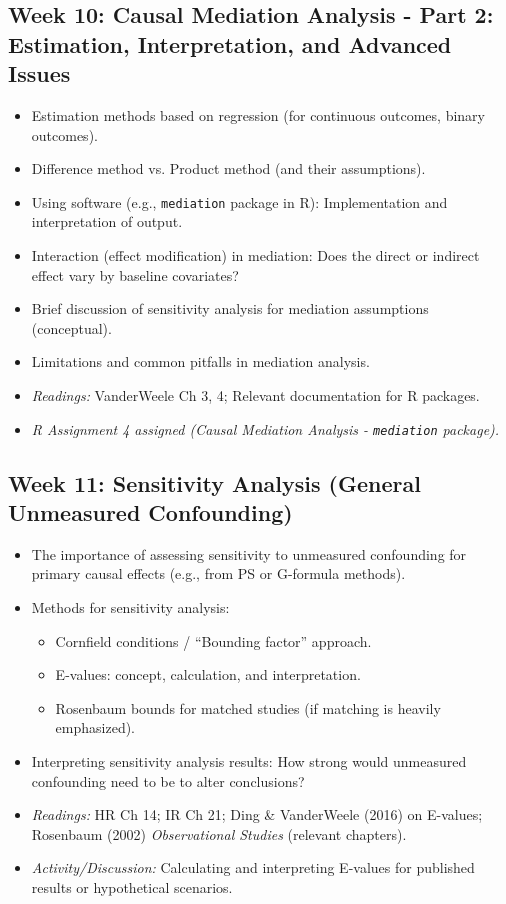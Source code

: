 \documentclass[10.5pt]{article}
\begin{document}
\subsection*{Week 10: Causal Mediation Analysis - Part 2: Estimation, Interpretation, and Advanced Issues}
\begin{itemize}
    \item Estimation methods based on regression (for continuous outcomes, binary outcomes).
    \item Difference method vs. Product method (and their assumptions).
    \item Using software (e.g., \texttt{mediation} package in R): Implementation and interpretation of output.
    \item Interaction (effect modification) in mediation: Does the direct or indirect effect vary by baseline covariates?
    \item Brief discussion of sensitivity analysis for mediation assumptions (conceptual).
    \item Limitations and common pitfalls in mediation analysis.
    \item \textit{Readings:} VanderWeele Ch 3, 4; Relevant documentation for R packages.
    \item \textit{R Assignment 4 assigned (Causal Mediation Analysis - \texttt{mediation} package).}
\end{itemize}

\subsection*{Week 11: Sensitivity Analysis (General Unmeasured Confounding)}
\begin{itemize}
    \item The importance of assessing sensitivity to unmeasured confounding for primary causal effects (e.g., from PS or G-formula methods).
    \item Methods for sensitivity analysis:
    \begin{itemize}
        \item Cornfield conditions / ``Bounding factor'' approach.
        \item E-values: concept, calculation, and interpretation.
        \item Rosenbaum bounds for matched studies (if matching is heavily emphasized).
    \end{itemize}
    \item Interpreting sensitivity analysis results: How strong would unmeasured confounding need to be to alter conclusions?
    \item \textit{Readings:} HR Ch 14; IR Ch 21; Ding \& VanderWeele (2016) on E-values; Rosenbaum (2002) \textit{Observational Studies} (relevant chapters).
    \item \textit{Activity/Discussion:} Calculating and interpreting E-values for published results or hypothetical scenarios.
\end{itemize}
\end{document}
